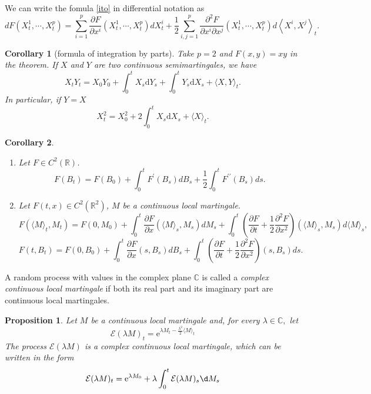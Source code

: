 \documentclass{report}
\newtheorem{proposition}{Proposition}[section]
\newtheorem{corollary}{Corollary}[section]
\theoremstyle{nonumberplain}
\begin{document}
We can write the fomula \ref{ito} in differential notation as
\[
dF\left(X_{t}^{1}, \cdots, X_{t}^{p}\right)=\sum_{i=1}^{p}  \frac{\partial F}{\partial x^{i}}\left(X_{t}^{1}, \cdots, X_{t}^{p}\right) d X_{t}^{i} 
+\frac{1}{2} \sum_{i, j=1}^{p}  \frac{\partial^{2} F}{\partial x^{i} \partial x^{j}}\left(X_{t}^{1}, \cdots, X_{t}^{p}\right) d\left\langle X^{i}, X^{j}\right\rangle_{t}.
\]

\begin{corollary}[formula of integration by parts]
	Take $p=2$ and $F(x, y)=x y$ in the theorem. If $X$ and $Y$ are two continuous semimartingales, we have
	\[
	X_{t} Y_{t}=X_{0} Y_{0}+\int_{0}^{t} X_{s} \mathrm{d} Y_{s}+\int_{0}^{t} Y_{s} \mathrm{d} X_{s}+\langle X, Y\rangle_{t}.
	\]
	In particular, if $Y=X$
	\[
	X_{t}^{2}=X_{0}^{2}+2 \int_{0}^{t} X_{s} \mathrm{d} X_{s}+\langle X\rangle_{t}.
	\]
\end{corollary}

\begin{corollary}
	\begin{enumerate}
		\item Let $F\in C^2(\mathbb{R})$.
		$$F\left(B_{t}\right)=F\left(B_{0}\right)+\int_{0}^{t} F^{\prime}\left(B_{s}\right) d B_{s}+\frac{1}{2} \int_{0}^{t} F^{\prime \prime}\left(B_{s}\right) d s.$$
		\item Let $F(t,x)\in C^2(\mathbb{R}^2)$, $M$ be a continuous local martingale.
		\[
		F\left(\langle M\rangle_{t}, M_{t}\right)=F\left(0, M_{0}\right)+\int_{0}^{t} \frac{\partial F}{\partial x}\left(\langle M\rangle_{s}, M_{s}\right) d M_{s}+\int_{0}^{t}\left(\frac{\partial F}{\partial t}+\frac{1}{2} \frac{\partial^{2} F}{\partial x^{2}}\right)\left(\langle M\rangle_{s}, M_{s}\right) d \langle M\rangle_{s},
		\]
		\[
		F\left(t, B_{t}\right)=F\left(0, B_{0}\right)+\int_{0}^{t} \frac{\partial F}{\partial x}\left(s, B_{s}\right) d B_{s}+\int_{0}^{t}\left(\frac{\partial F}{\partial t}+\frac{1}{2} \frac{\partial^{2} F}{\partial x^{2}}\right)\left(s, B_{s}\right) d s.
		\]
	\end{enumerate}
	
	
\end{corollary}

A random process with values in the complex plane $\mathbb{C}$ is called a \emph{complex continuous local martingale} if both its real part and its imaginary part are continuous local martingales.

\begin{proposition}
	Let $M$ be a continuous local martingale and, for every $\lambda \in \mathbb{C},$ let
	\[
	\mathcal{E}(\lambda M)_{t}=\mathrm{e}^{\lambda M_{t}-\tfrac{\lambda^{2}}{2}\langle M\rangle_{t}}
	\]
	The process $\mathcal{E}(\lambda M)$ is a complex continuous local martingale, which can be written
	in the form
	\[
	\mathcal{E}(\lambda M)_{t}=\mathrm{e}^{\lambda M_{0}}+\lambda \int_{0}^{t} \mathcal{E}(\lambda M)_{s} \d M_{s}
	\]
\end{proposition}
\end{document}
